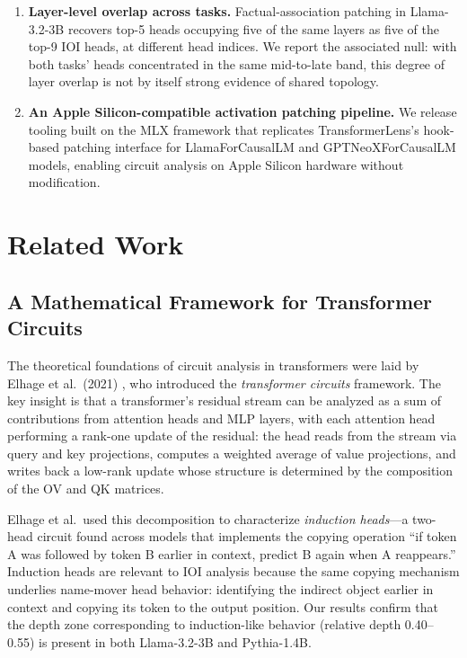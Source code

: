 \documentclass[11pt,a4paper]{article}
\begin{document}
\begin{enumerate}
  \item \textbf{Layer-level overlap across tasks.}  Factual-association patching in
    Llama-3.2-3B recovers top-5 heads occupying five of the same layers as five of the
    top-9 IOI heads, at different head indices. We report the associated null: with
    both tasks' heads concentrated in the same mid-to-late band, this degree of layer
    overlap is not by itself strong evidence of shared topology.

  \item \textbf{An Apple Silicon-compatible activation patching pipeline.}  We release
    tooling built on the MLX framework that replicates TransformerLens's hook-based
    patching interface for LlamaForCausalLM and GPTNeoXForCausalLM models, enabling
    circuit analysis on Apple Silicon hardware without modification.
\end{enumerate}

\section{Related Work}
\label{sec:related}

\subsection{A Mathematical Framework for Transformer Circuits}

The theoretical foundations of circuit analysis in transformers were laid by Elhage et
al.\ (2021) \citep{elhage2021mathematical}, who introduced the \emph{transformer
circuits} framework. The key insight is that a transformer's residual stream can be
analyzed as a sum of contributions from attention heads and MLP layers, with each
attention head performing a rank-one update of the residual: the head reads from the
stream via query and key projections, computes a weighted average of value projections,
and writes back a low-rank update whose structure is determined by the composition of
the OV and QK matrices.

Elhage et al.\ used this decomposition to characterize \emph{induction heads}---a
two-head circuit found across models that implements the copying operation ``if token A
was followed by token B earlier in context, predict B again when A reappears.''
Induction heads are relevant to IOI analysis because the same copying mechanism
underlies name-mover head behavior: identifying the indirect object earlier in context
and copying its token to the output position. Our results confirm that the depth zone
corresponding to induction-like behavior (relative depth 0.40--0.55) is present in
both Llama-3.2-3B and Pythia-1.4B.
\end{document}
